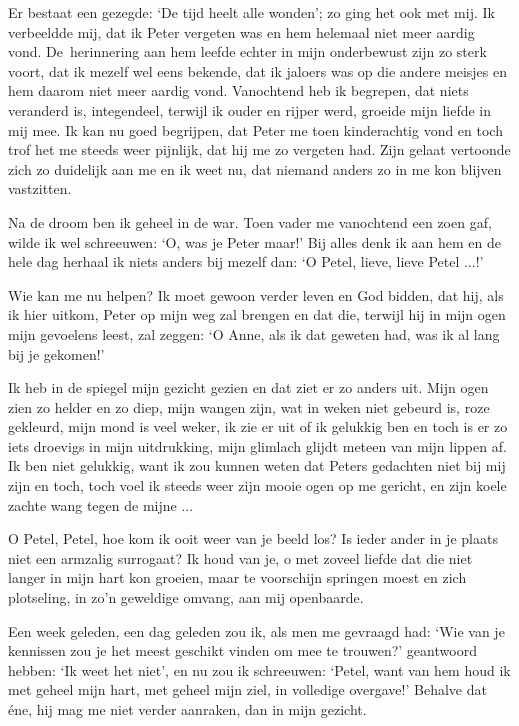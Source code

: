 \documentclass{book}
\begin{document}
Er bestaat een gezegde: `De tijd heelt alle wonden'; zo ging het ook met mij. Ik
verbeeldde mij, dat ik Peter vergeten was en hem helemaal niet meer aardig vond.
De~herinnering aan hem leefde echter in mijn onderbewust zijn zo sterk voort,
dat ik mezelf wel eens bekende, dat ik jaloers was op die andere meisjes en hem
daarom niet meer aardig vond.  Vanochtend heb ik begrepen, dat niets veranderd
is, integendeel, terwijl ik ouder en rijper werd, groeide mijn liefde in mij
mee. Ik kan nu goed begrijpen, dat Peter me toen kinderachtig vond en toch trof
het me steeds weer pijnlijk, dat hij me zo vergeten had. Zijn gelaat vertoonde
zich zo duidelijk aan me en ik weet nu, dat niemand anders zo in me kon blijven
vastzitten.

Na de droom ben ik geheel in de war. Toen vader me vanochtend een zoen gaf,
wilde ik wel schreeuwen: `O, was je Peter maar!' Bij alles denk ik aan hem en de
hele dag herhaal ik niets anders bij mezelf dan: `O Petel, lieve, lieve Petel
...!'

Wie kan me nu helpen? Ik moet gewoon verder leven en God bidden, dat hij, als ik
hier uitkom, Peter op mijn weg zal brengen en dat die, terwijl hij in mijn ogen
mijn gevoelens leest, zal zeggen: `O Anne, als ik dat geweten had, was ik al
lang bij je gekomen!'

Ik heb in de spiegel mijn gezicht gezien en dat ziet er zo anders uit.  Mijn
ogen zien zo helder en zo diep, mijn wangen zijn, wat in weken niet gebeurd is,
roze gekleurd, mijn mond is veel weker, ik zie er uit of ik gelukkig ben en toch
is er zo iets droevigs in mijn uitdrukking, mijn glimlach glijdt meteen van mijn
lippen af. Ik ben niet gelukkig, want ik zou kunnen weten dat Peters gedachten
niet bij mij zijn en toch, toch voel ik steeds weer zijn mooie ogen op me
gericht, en zijn koele zachte wang tegen de mijne ...

O Petel, Petel, hoe kom ik ooit weer van je beeld los? Is ieder ander in je
plaats niet een armzalig surrogaat? Ik houd van je, o met zoveel liefde dat die
niet langer in mijn hart kon groeien, maar te voorschijn springen moest en zich
plotseling, in zo'n geweldige omvang, aan mij openbaarde.

Een week geleden, een dag geleden zou ik, als men me gevraagd had: `Wie van je
kennissen zou je het meest geschikt vinden om mee te trouwen?' geantwoord
hebben: `Ik weet het niet', en nu zou ik schreeuwen: `Petel, want van hem houd
ik met geheel mijn hart, met geheel mijn ziel, in volledige overgave!' Behalve
dat éne, hij mag me niet verder aanraken, dan in mijn gezicht.
\end{document}
